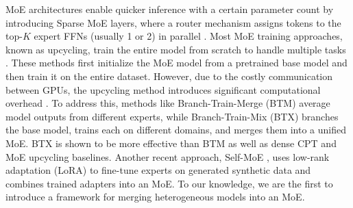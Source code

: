 MoE architectures enable quicker inference with a certain parameter count by introducing Sparse MoE layers, where a router mechanism assigns tokens to the top-$K$ expert FFNs (usually 1 or 2) in parallel \cite{fedus2022switch, shazeer2017outrageously, zhang2022mixtureattentionheadsselecting}. Most MoE training approaches, known as upcycling, train the entire model from scratch to handle multiple tasks \cite{komatsuzaki2022sparse, jiang2024mixtral, dou2024loramoe, dai2024deepseekmoe}. These methods first initialize the MoE model from a pretrained base model and then train it on the entire dataset. However, due to the costly communication between GPUs, the upcycling method introduces significant computational overhead \cite{sukhbaatar2024branchtrainmixmixingexpertllms, li-etal-2024-pedants}. To address this, methods like Branch-Train-Merge (BTM) \cite{gururangan2023scaling, li2022branch} average model outputs from different experts, while Branch-Train-Mix (BTX) \cite{sukhbaatar2024branchtrainmixmixingexpertllms} branches the base model, trains each on different domains, and merges them into a unified MoE. 
BTX is shown to be more effective than BTM as well as dense CPT and MoE upcycling baselines.
Another recent approach, Self-MoE \cite{kang2024self}, uses low-rank adaptation (LoRA) \cite{hu2021lora} to fine-tune experts on generated synthetic data \cite{liu2024csrec} and combines trained adapters into an MoE.
To our knowledge, we are the first to introduce a framework for merging heterogeneous models into an MoE.
